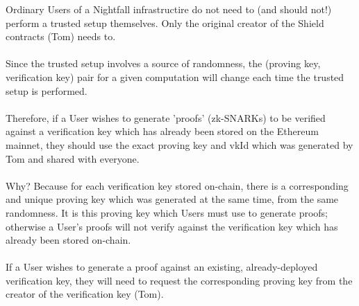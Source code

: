 \documentclass{article}
\begin{document}
Ordinary Users of a Nightfall infrastructire do not need to (and should not!) perform a trusted setup themselves. Only the original creator of the Shield contracts (Tom) needs to.\\
\\
Since the trusted setup involves a source of randomness, the (proving key, verification key) pair for a given computation will change each time the trusted setup is performed.\\
\\
Therefore, if a User wishes to generate 'proofs' (zk-SNARKs) to be verified against a verification key which has already been stored on the Ethereum mainnet, they should use the exact proving key and vkId which was generated by Tom and shared with everyone.\\
\\
Why? Because for each verification key stored on-chain, there is a corresponding and unique proving key which was generated at the same time, from the same randomness. It is this proving key which Users must use to generate proofs; otherwise a User's proofs will not verify against the verification key which has already been stored on-chain.\\
\\
If a User wishes to generate a proof against an existing, already-deployed verification key, they will need to request the corresponding proving key from the creator of the verification key (Tom).
\end{document}
